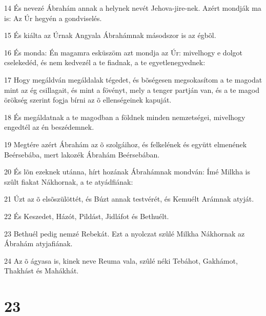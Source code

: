 \par 14 És nevezé Ábrahám annak a helynek nevét Jehova-jire-nek. Azért mondják ma is: Az Úr hegyén a gondviselés.
\par 15 És kiálta az Úrnak Angyala Ábrahámnak másodszor is az égbõl.
\par 16 És monda: Én magamra esküszöm azt mondja az Úr: mivelhogy e dolgot cselekedéd, és nem kedvezél a te fiadnak, a te egyetlenegyednek:
\par 17 Hogy megáldván megáldalak tégedet, és bõségesen megsokasítom a te magodat mint az ég csillagait, és mint a fövényt, mely a tenger partján van, és a te magod örökség szerint fogja bírni az õ ellenségeinek kapuját.
\par 18 És megáldatnak a te magodban a földnek minden nemzetségei, mivelhogy engedtél az én beszédemnek.
\par 19 Megtére azért Ábrahám az õ szolgáihoz, és felkelének és együtt elmenének Beérsebába, mert lakozék Ábrahám Beérsebában.
\par 20 És lõn ezeknek utánna, hírt hozának Ábrahámnak mondván: Ímé Milkha is szûlt fiakat Nákhornak, a te atyádfiának:
\par 21 Úzt az õ elsõszülöttét, és Búzt annak testvérét, és Kemuélt Arámnak atyját.
\par 22 És Keszedet, Házót, Pildást, Jidláfot és Bethuélt.
\par 23 Bethuél pedig nemzé Rebekát. Ezt a nyolczat szûlé Milkha Nákhornak az Ábrahám atyjafiának.
\par 24 Az õ ágyasa is, kinek neve Reuma vala, szûlé néki Tebáhot, Gakhámot, Thakhást és Mahákhát.

\chapter{23}

